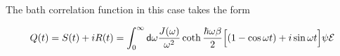 The bath correlation function in this case takes the form

\[ Q(t) = S(t) + i R(t) = \int_{0}^{\infty} \mathsf{d} \omega \frac{J(\omega)}{\omega^2} 
\coth \frac{\hbar \omega \beta}{2} \Bigl[ \left( 1 - \cos \omega t  \right) + i \sin \omega 
t \Bigr] \psi \mathcal{E} \]